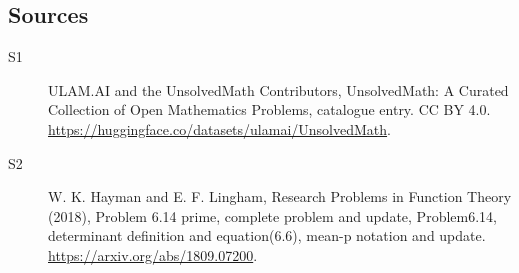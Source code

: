 \documentclass[11pt]{article}
\begin{document}
\subsection{Sources}
\begin{description}
\item[\hypertarget{source:statement:1}{S1}] ULAM.AI and the UnsolvedMath Contributors, UnsolvedMath: A Curated Collection of Open Mathematics Problems, catalogue entry. CC BY 4.0. \url{https://huggingface.co/datasets/ulamai/UnsolvedMath}.
\item[\hypertarget{source:statement:2}{S2}] W. K. Hayman and E. F. Lingham, Research Problems in Function Theory (2018), Problem 6.14 prime, complete problem and update, Problem6.14, determinant definition and equation(6.6), mean-p notation and update. \url{https://arxiv.org/abs/1809.07200}.
\end{description}
\label{end:statement}
\end{document}
